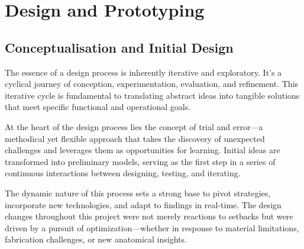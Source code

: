\chapter{Design and Prototyping}\label{ch:DesProt}
\vspace{-2.5em}
{}\synopsisDesign
\mynewline
\section{Conceptualisation and Initial Design}
The essence of a design process is inherently iterative and exploratory. It's a cyclical journey of conception, experimentation, evaluation, and refinement. This iterative cycle is fundamental to translating abstract ideas into tangible solutions that meet specific functional and operational goals.

At the heart of the design process lies the concept of trial and error—a methodical yet flexible approach that takes the discovery of unexpected challenges and leverages them as opportunities for learning. Initial ideas are transformed into preliminary models, serving as the first step in a series of continuous interactions between designing, testing, and iterating.

The dynamic nature of this process sets a strong base to pivot strategies, incorporate new technologies, and adapt to findings in real-time. The design changes throughout this project were not merely reactions to setbacks but were driven by a pursuit of optimization—whether in response to material limitations, fabrication challenges, or new anatomical insights.



